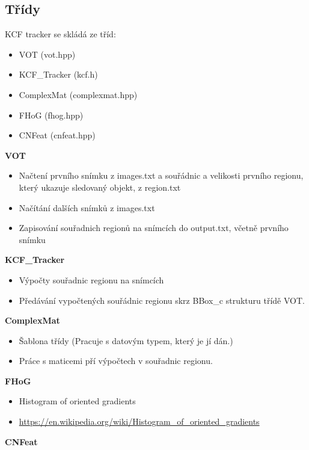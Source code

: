 \documentclass{article}
\begin{document}
\subsection{Třídy}
KCF tracker se skládá ze tříd:
\begin{itemize}
	\item VOT (vot.hpp)
	\item KCF\_Tracker (kcf.h)
	\item ComplexMat (complexmat.hpp)
	\item FHoG (fhog.hpp)
	\item CNFeat (cnfeat.hpp)
\end{itemize}
\textbf{VOT}
\begin{itemize}
	\item Načtení prvního snímku z images.txt a souřádnic a velikosti prvního regionu, který ukazuje sledovaný objekt, z region.txt
	\item Načítání dalších snímků z images.txt
	\item Zapisování souřadnich regionů na snímcích do output.txt, včetně prvního snímku
\end{itemize}
\textbf{KCF\_Tracker}
\begin{itemize}
	\item Výpočty souřadnic regionu na snímcích
	\item Předávání vypočtených souřádnic regionu skrz BBox\_c strukturu třídě VOT.
\end{itemize}
\textbf{ComplexMat}
\begin{itemize}
	\item Šablona třídy (Pracuje s datovým typem, který je jí dán.)
	\item Práce s maticemi pří výpočtech v souřadnic regionu.
\end{itemize}
\textbf{FHoG}
\begin{itemize}
	\item Histogram of oriented gradients
	\item \url{https://en.wikipedia.org/wiki/Histogram_of_oriented_gradients}
\end{itemize}
\textbf{CNFeat}
\end{document}

